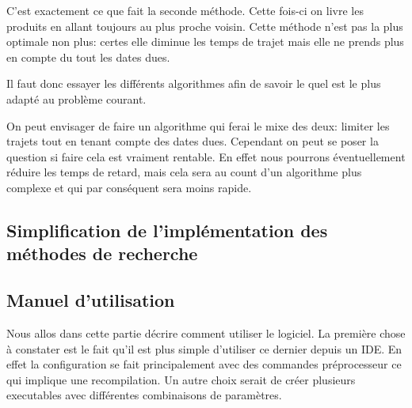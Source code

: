\documentclass[hideweeklyreports]{polytech/polytech}
\begin{document}
				C'est exactement ce que fait la seconde méthode. Cette fois-ci on livre les produits en allant toujours au plus proche voisin. Cette méthode n'est pas la plus optimale non plus: certes elle diminue les temps de trajet mais elle ne prends plus en compte du tout les dates dues.
				
				Il faut donc essayer les différents algorithmes afin de savoir le quel est le plus adapté au problème courant.
				
				On peut envisager de faire un algorithme qui ferai le mixe des deux: limiter les trajets tout en tenant compte des dates dues. Cependant on peut se poser la question si faire cela est vraiment rentable. En effet nous pourrons éventuellement réduire les temps de retard, mais cela sera au count d'un algorithme plus complexe et qui par conséquent sera moins rapide. 
				
			\subsection{\label{searchfunc}Simplification de l'implémentation des méthodes de recherche}%
			
			\subsection{Manuel d'utilisation}
			Nous allos dans cette partie décrire comment utiliser le logiciel. La première chose à constater est le fait qu'il est plus simple d'utiliser ce dernier depuis un IDE. En effet la configuration se fait principalement avec des commandes préprocesseur ce qui implique une recompilation. Un autre choix serait de créer plusieurs executables avec différentes combinaisons de paramètres.
			
\end{document}
